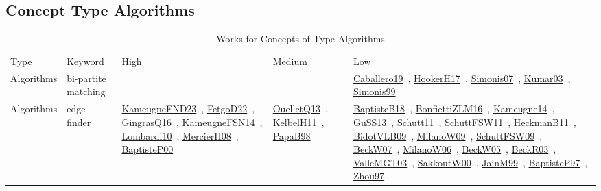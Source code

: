 \clearpage
\subsection{Concept Type Algorithms}
\label{sec:Algorithms}
{\scriptsize
\begin{longtable}{lp{3cm}>{\raggedright\arraybackslash}p{6cm}>{\raggedright\arraybackslash}p{6cm}>{\raggedright\arraybackslash}p{8cm}}
\rowcolor{white}\caption{Works for Concepts of Type Algorithms}\\ \toprule
\rowcolor{white}Type & Keyword & High & Medium & Low\\ \midrule\endhead
\bottomrule
\endfoot
Algorithms & bi-partite matching &  &  & \href{works/Caballero19.pdf}{Caballero19}~\cite{Caballero19}, \href{works/HookerH17.pdf}{HookerH17}~\cite{HookerH17}, \href{works/Simonis07.pdf}{Simonis07}~\cite{Simonis07}, \href{works/Kumar03.pdf}{Kumar03}~\cite{Kumar03}, \href{works/Simonis99.pdf}{Simonis99}~\cite{Simonis99}\\
Algorithms & edge-finder & \href{works/KameugneFND23.pdf}{KameugneFND23}~\cite{KameugneFND23}, \href{works/FetgoD22.pdf}{FetgoD22}~\cite{FetgoD22}, \href{works/GingrasQ16.pdf}{GingrasQ16}~\cite{GingrasQ16}, \href{works/KameugneFSN14.pdf}{KameugneFSN14}~\cite{KameugneFSN14}, \href{works/Lombardi10.pdf}{Lombardi10}~\cite{Lombardi10}, \href{works/MercierH08.pdf}{MercierH08}~\cite{MercierH08}, \href{works/BaptisteP00.pdf}{BaptisteP00}~\cite{BaptisteP00} & \href{works/OuelletQ13.pdf}{OuelletQ13}~\cite{OuelletQ13}, \href{works/KelbelH11.pdf}{KelbelH11}~\cite{KelbelH11}, \href{works/PapaB98.pdf}{PapaB98}~\cite{PapaB98} & \href{works/BaptisteB18.pdf}{BaptisteB18}~\cite{BaptisteB18}, \href{works/BonfiettiZLM16.pdf}{BonfiettiZLM16}~\cite{BonfiettiZLM16}, \href{works/Kameugne14.pdf}{Kameugne14}~\cite{Kameugne14}, \href{works/GuSS13.pdf}{GuSS13}~\cite{GuSS13}, \href{works/Schutt11.pdf}{Schutt11}~\cite{Schutt11}, \href{works/SchuttFSW11.pdf}{SchuttFSW11}~\cite{SchuttFSW11}, \href{works/HeckmanB11.pdf}{HeckmanB11}~\cite{HeckmanB11}, \href{works/BidotVLB09.pdf}{BidotVLB09}~\cite{BidotVLB09}, \href{works/MilanoW09.pdf}{MilanoW09}~\cite{MilanoW09}, \href{works/SchuttFSW09.pdf}{SchuttFSW09}~\cite{SchuttFSW09}, \href{works/BeckW07.pdf}{BeckW07}~\cite{BeckW07}, \href{works/MilanoW06.pdf}{MilanoW06}~\cite{MilanoW06}, \href{works/BeckW05.pdf}{BeckW05}~\cite{BeckW05}, \href{works/BeckR03.pdf}{BeckR03}~\cite{BeckR03}, \href{works/ValleMGT03.pdf}{ValleMGT03}~\cite{ValleMGT03}, \href{works/SakkoutW00.pdf}{SakkoutW00}~\cite{SakkoutW00}, \href{works/JainM99.pdf}{JainM99}~\cite{JainM99}, \href{works/BaptisteP97.pdf}{BaptisteP97}~\cite{BaptisteP97}, \href{works/Zhou97.pdf}{Zhou97}~\cite{Zhou97}\\

\end{longtable}}
